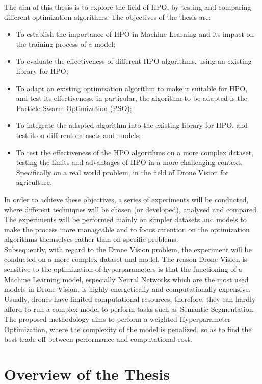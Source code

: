The aim of this thesis is to explore the field of HPO, by testing and comparing different optimization algorithms.
The objectives of the thesis are:
\begin{itemize}[itemsep=0.1cm]
	\item To establish the importance of HPO in Machine Learning and its impact on the training process of a model;
	\item To evaluate the effectiveness of different HPO algorithms, using an existing library for HPO;
	\item To adapt an existing optimization algorithm to make it suitable for HPO, and test its effectiveness; in particular, the algorithm to be adapted is the Particle Swarm Optimization (PSO);
	\item To integrate the adapted algorithm into the existing library for HPO, and test it on different datasets and models;
	\item To test the effectiveness of the HPO algorithms on a more complex dataset, testing the limits and advantages of HPO in a more challenging context. Specifically on a real world problem, in the field of Drone Vision for agriculture.
\end{itemize}
In order to achieve these objectives, a series of experiments will be conducted, where different techniques will be chosen (or developed), analysed and compared. The experiments will be performed mainly on simpler datasets and models to make the process more manageable and to focus attention on the optimization algorithms themselves rather than on specific problems.
\\[0.3cm]Subsequently, with regard to the Drone Vision problem, the experiment will be conducted on a more complex dataset and model. The reason Drone Vision is sensitive to the optimization of hyperparameters is that the functioning of a Machine Learning model, especially Neural Networks which are the most used models in Drone Vision, is highly energetically and computationally expensive. Usually, drones have limited computational resources, therefore, they can hardly afford to run a complex model to perform tasks such as Semantic Segmentation. The proposed methodology aims to perform a weighted Hyperparameter Optimization, where the complexity of the model is penalized, so as to find the best trade-off between performance and computational cost. 

\section{Overview of the Thesis}

